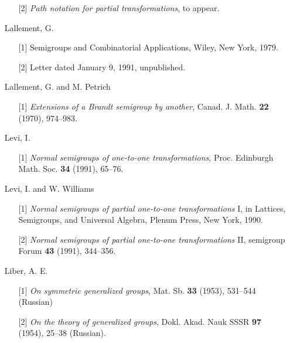 \documentclass{surv-l}
\numberwithin{equation}{section}
\numberwithin{table}{section}
\numberwithin{figure}{section}
\theoremstyle{definition}
\begin{document}
\begin{enumerate}
\begin{enumerate}
\item[\hypertarget{bib37a}{[2]}] \emph{Path notation for partial transformations}, to
appear.
\end{enumerate}

\item[] Lallement, G.
\begin{enumerate}
\item[\hypertarget{bib38}{[1]}] Semigroups and Combinatorial Applications, Wiley, New
York, 1979.

\item[\hypertarget{bib38a}{[2]}] Letter dated January 9, 1991, unpublished.
\end{enumerate}

\item[] Lallement, G. and M. Petrich
\begin{enumerate}
\item[\hypertarget{bib39}{[1]}] \emph{Extensions of a Brandt semigroup
by another}, Canad. J. Math. \textbf{22} (1970), 974--983.
\end{enumerate}

\item[] Levi, I.
\begin{enumerate}
\item[\hypertarget{bib40}{[1]}] \emph{Normal semigroups of one-to-one
transformations}, Proc. Edinburgh Math. Soc. \textbf{34}
(1991), 65--76.
\end{enumerate}

\item[] Levi, I. and W. Williams
\begin{enumerate}
\item[\hypertarget{bib41}{[1]}] \emph{Normal semigroups of partial one-to-one
transformations} I, in Lattices, Semigroups, and Universal
Algebra, Plenum Press, New York, 1990.

\item[\hypertarget{bib41a}{[2]}] \emph{Normal semigroups of partial one-to-one
transformations} II, semigroup Forum \textbf{43} (1991),
344--356.
\end{enumerate}

\item[] Liber, A. E.
\begin{enumerate}
\item[\hypertarget{bib42}{[1]}] \emph{On symmetric generalized groups}, Mat. Sb. \textbf{33}
(1953), 531--544 (Russian)

\item[\hypertarget{bib42a}{[2]}] \emph{On the theory of generalized groups}, Dokl.
Akad. Nauk SSSR \textbf{97} (1954), 25--38 (Russian).
\end{enumerate}


\end{enumerate}
\end{document}
